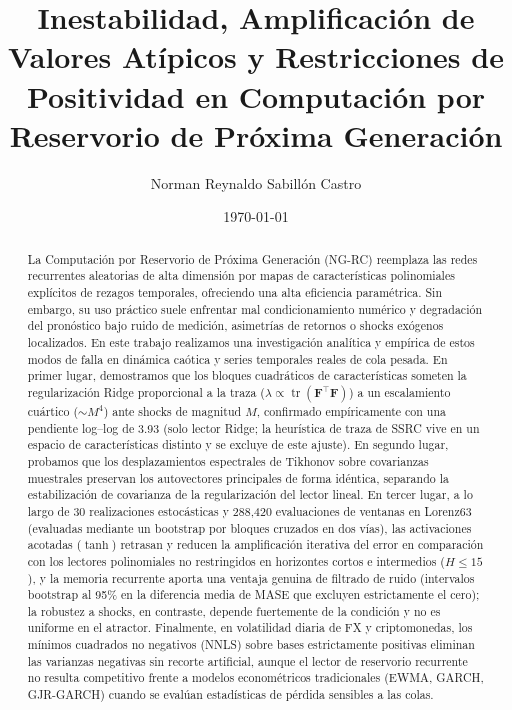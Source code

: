 \documentclass[aip,cha,reprint,amsmath,amssymb]{revtex4-2}
\begin{document}
\title{Inestabilidad, Amplificación de Valores Atípicos y Restricciones de Positividad en Computación por Reservorio de Próxima Generación}

\author{Norman Reynaldo Sabill{\'o}n Castro}

\date{\today}

\begin{abstract}
La Computación por Reservorio de Próxima Generación (NG-RC) reemplaza las redes recurrentes aleatorias de alta dimensión por mapas de características polinomiales explícitos de rezagos temporales, ofreciendo una alta eficiencia paramétrica. Sin embargo, su uso práctico suele enfrentar mal condicionamiento numérico y degradación del pronóstico bajo ruido de medición, asimetrías de retornos o shocks exógenos localizados. En este trabajo realizamos una investigación analítica y empírica de estos modos de falla en dinámica caótica y series temporales reales de cola pesada. En primer lugar, demostramos que los bloques cuadráticos de características someten la regularización Ridge proporcional a la traza ($\lambda \propto \operatorname{tr}(\mathbf{F}^\top\mathbf{F})$) a un escalamiento cuártico ($\sim M^4$) ante shocks de magnitud $M$, confirmado empíricamente con una pendiente log--log de 3.93 (solo lector Ridge; la heurística de traza de SSRC vive en un espacio de características distinto y se excluye de este ajuste). En segundo lugar, probamos que los desplazamientos espectrales de Tikhonov sobre covarianzas muestrales preservan los autovectores principales de forma idéntica, separando la estabilización de covarianza de la regularización del lector lineal. En tercer lugar, a lo largo de 30 realizaciones estocásticas y 288,420 evaluaciones de ventanas en Lorenz63 (evaluadas mediante un bootstrap por bloques cruzados en dos vías), las activaciones acotadas ($\tanh$) retrasan y reducen la amplificación iterativa del error en comparación con los lectores polinomiales no restringidos en horizontes cortos e intermedios ($H \le 15$), y la memoria recurrente aporta una ventaja genuina de filtrado de ruido (intervalos bootstrap al 95\% en la diferencia media de MASE que excluyen estrictamente el cero); la robustez a shocks, en contraste, depende fuertemente de la condición y no es uniforme en el atractor. Finalmente, en volatilidad diaria de FX y criptomonedas, los mínimos cuadrados no negativos (NNLS) sobre bases estrictamente positivas eliminan las varianzas negativas sin recorte artificial, aunque el lector de reservorio recurrente no resulta competitivo frente a modelos econométricos tradicionales (EWMA, GARCH, GJR-GARCH) cuando se evalúan estadísticas de pérdida sensibles a las colas.
\end{abstract}
\end{document}
